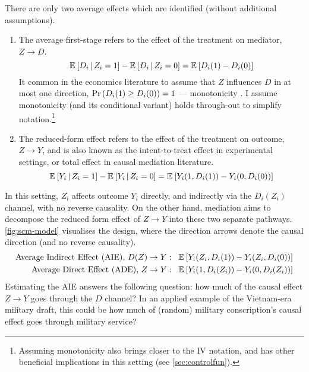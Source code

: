 There are only two average effects which are identified (without additional assumptions).
\begin{enumerate}
    \item The average first-stage refers to the effect of the treatment on mediator, $Z \to D$.
    \[ \mathbb{E}_{} \left[ D_i \, \middle\vert \, Z_i = 1 \right] - \mathbb{E}_{} \left[ D_i \, \middle\vert \, Z_i = 0 \right]
        = \mathbb{E}_{} \left[ D_i(1) - D_i(0) \right] \]
    It common in the economics literature to assume that $Z$ influences $D$ in at most one direction, $\Pr\left( D_i(1) \geq D_i(0) \right) = 1$ --- monotonicity \citep{imbens1994identification}.
    I assume monotonicity (and its conditional variant) holds through-out to simplify notation.\footnote{
        Assuming monotonicity also brings closer to the IV notation, and has other beneficial implications in this setting (see \autoref{sec:controlfun}).
    }
    \item The reduced-form effect refers to the effect of the treatment on outcome, $Z \to Y$, and is also known as the intent-to-treat effect in experimental settings, or total effect in causal mediation literature.
    \[ \mathbb{E}_{} \left[ Y_i \, \middle\vert \, Z_i = 1 \right] - \mathbb{E}_{} \left[ Y_i \, \middle\vert \, Z_i = 0 \right]
        = \mathbb{E}_{} \left[ Y_i(1, D_i(1)) - Y_i(0, D_i(0)) \right] \]
\end{enumerate}
In this setting, $Z_i$ affects outcome $Y_i$ directly, and indirectly via the $D_i(Z_i)$ channel, with no reverse causality.
On the other hand, mediation aims to decompose the reduced form effect of $Z \to Y$ into these two separate pathways.
\autoref{fig:scm-model} visualises the design, where the direction arrows denote the causal direction (and no reverse causality).
\begin{align*}
    \text{Average Indirect Effect (AIE), } D(Z) \to Y: \;\;\;&
        \mathbb{E}_{} \left[ Y_i(Z_i, D_i(1)) - Y_i(Z_i, D_i(0)) \right] \\
    \text{Average Direct Effect (ADE), } Z \to Y: \;\;\;&
        \mathbb{E}_{} \left[ Y_i(1, D_i(Z_i)) - Y_i(0, D_i(Z_i)) \right]
\end{align*}
Estimating the AIE answers the following question: how much of the causal effect $Z \to Y$ goes through the $D$ channel?
In an applied example of the Vietnam-era military draft, this could be how much of (random) military conscription's causal effect goes through military service?
